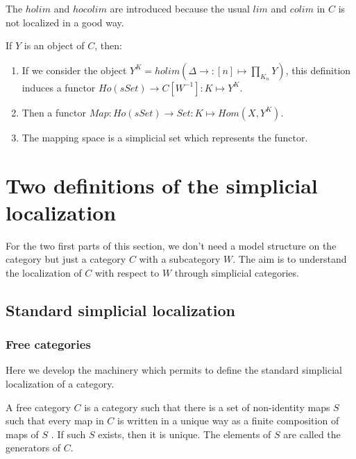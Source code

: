 \begin{rmk}
The $holim$ and $hocolim$ are introduced because the usual $lim$ and $colim$ in $C$ is not localized in a good way. 
\end{rmk}

\begin{defin}
If $Y$ is an object of $C$, then:
\begin{enumerate}
\item If we consider the object $Y^K=holim(\Delta \rightarrow : [n] \mapsto \prod_{K_n} Y)$, this definition induces a functor $Ho(sSet) \rightarrow C[W^{-1}] : K \mapsto Y^K$.
\item Then a functor $Map : Ho(sSet) \rightarrow Set : K \mapsto Hom(X,Y^K)$.
\item The mapping space is a simplicial set which represents the functor.

\end{enumerate}
\end{defin}


\section{Two definitions of the simplicial localization}

For the two first parts of this section, we don't need a model structure on the category but just a category $C$ with a subcategory $W$. The aim is to understand the localization of $C$ with respect to $W$ through simplicial categories.

\subsection{Standard simplicial localization}

\subsubsection{Free categories}

Here we develop the machinery which permits to define the standard simplicial localization of a category.

\begin{defin}
A free category $C$ is a category such that there is a set of non-identity maps $S$ such that every map in $C$ is written in a unique way as a finite composition of maps of $S$ . If such $S$ exists, then it is unique. The elements of $S$ are called the generators of $C$.
\end{defin}


